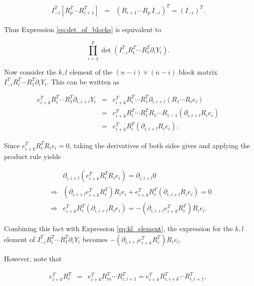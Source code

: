 \documentclass[ba]{imsart}
\numberwithin{equation}{section}
\theoremstyle{plain}
\begin{document}
\begin{eqnarray}
I_{-i}^T
\left[ R_p^T \cdots R_{i+1}^T\right]  &=& \left( R_{i+1} \cdots R_p\, I_{-i} \right)^T = \left( I_{-i} \right)^T.
\end{eqnarray}

\noindent Thus Expression \ref{eq:det_of_blocks} is equivalent to

\begin{equation}
\label{eq:simplified_determinant}
\prod_{i=1}^p \det \left( I_{-i}^T R_i^T \cdots R_1^T \partial_{i} Y_i \right).
\end{equation}

\noindent Now consider the $k,l$ element of the $(n-i) \times (n-i)$ block matrix $I_{-i}^T R_i^T \cdots R_1^T \partial_{i} Y_i $. This can be written as 

\begin{eqnarray}
\label{eq:kl_element}
e_{i+k}^T R_i^T \cdots R_1^T \partial_{i,i+l} Y_i &=&  e_{i+k}^T R_i^T \cdots R_1^T \partial_{i,i+l} (R_1 \cdots R_i e_i)\nonumber \\ \nonumber
&=&  e_{i+k}^T R_i^T \cdots R_1^T R_1 \cdots R_{i-1} (\partial_{i,i+l} R_i e_i)\nonumber \\ 
&=&  e_{i+k}^T R_i^T  (\partial_{i,i+l} R_i e_i).
\end{eqnarray}

\noindent Since  $e_{i+k}^T R_i^T R_i e_i =0$, taking the derivatives of both sides gives and applying the product rule yields

\begin{eqnarray}
&&\partial_{i,i+l} (e_{i+k}^T R_i^T R_i e_i) = \partial_{i,i+l} 0\nonumber \\
&\Rightarrow& (\partial_{i,i+l} e_{i+k}^T R_i^T) R_i e_i + e_{i+k}^T R_i^T ( \partial_{i,i+l}R_i e_i) = 0\nonumber \\
&\Rightarrow& e_{i+k}^T R_i^T  (\partial_{i,i+l}R_i e_i) = -(\partial_{i,i+l} e_{i+k}^T R_i^T) R_i e_i.
\end{eqnarray}

\noindent Combining this fact with Expression \ref{eq:kl_element}, the expression for the $k,l$ element of $I_{-i}^T R_i^T \cdots R_1^T \partial_{i} Y_i $ becomes $-(\partial_{i,i+l} e_{i+k}^T R_i^T) R_i e_i$.

\noindent However, note that

\begin{eqnarray}
e_{i+k}^T R_i^T &=&  e_{i+k}^T R_{in}^T \cdots R_{i,i+1}^T = e_{i+k}^T R_{i,i+k}^T \cdots R_{i,i+1}^T,
\end{eqnarray}
\end{document}

